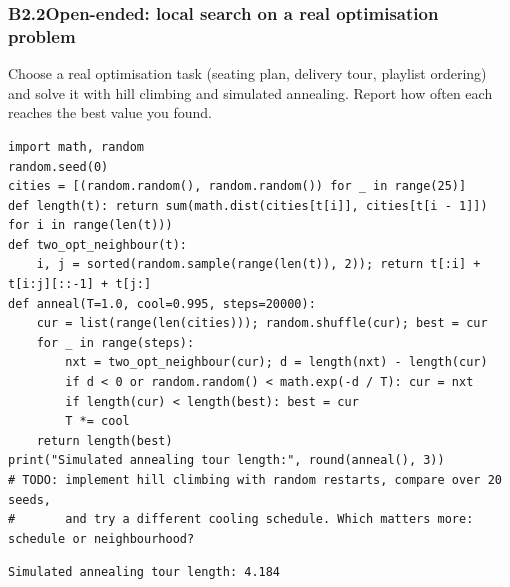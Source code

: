\documentclass[11pt]{article}
\begin{document}
\subsubsection*{B2.2\quad Open-ended: local search on a real optimisation problem}
Choose a real optimisation task (seating plan, delivery tour, playlist ordering) and solve it with hill climbing and simulated annealing. Report how often each reaches the best value you found.
\begin{lstlisting}[style=py]
import math, random
random.seed(0)
cities = [(random.random(), random.random()) for _ in range(25)]
def length(t): return sum(math.dist(cities[t[i]], cities[t[i - 1]]) for i in range(len(t)))
def two_opt_neighbour(t):
    i, j = sorted(random.sample(range(len(t)), 2)); return t[:i] + t[i:j][::-1] + t[j:]
def anneal(T=1.0, cool=0.995, steps=20000):
    cur = list(range(len(cities))); random.shuffle(cur); best = cur
    for _ in range(steps):
        nxt = two_opt_neighbour(cur); d = length(nxt) - length(cur)
        if d < 0 or random.random() < math.exp(-d / T): cur = nxt
        if length(cur) < length(best): best = cur
        T *= cool
    return length(best)
print("Simulated annealing tour length:", round(anneal(), 3))
# TODO: implement hill climbing with random restarts, compare over 20 seeds,
#       and try a different cooling schedule. Which matters more: schedule or neighbourhood?
\end{lstlisting}
\begin{lstlisting}[style=out]
Simulated annealing tour length: 4.184
\end{lstlisting}
\end{document}
